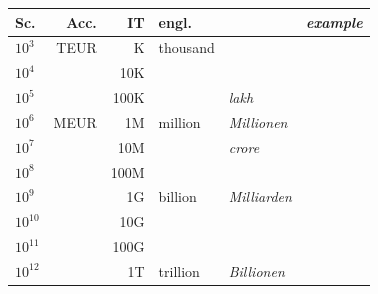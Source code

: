 \documentclass{standalone}
\begin{document}
       \begin{tabular}{lrrll|l}
        Sc. & Acc. & IT & engl. &  & \textit{example} \\
        \toprule
         $10^3$ & TEUR & K & thousand &  & \phantom{laptop/computer}\\
        $10^4$ & & 10K & &  & \\
        $10^5$ & & 100K & & \emph{lakh} & \\
        \midrule
        $10^6$ & MEUR& 1M & million & \emph{Millionen} &  \\
        $10^7$ & & 10M & &  \emph{crore} & \\
        $10^8$ & & 100M & &  & \\
        \midrule
        $10^9$ &  & 1G & billion & \emph{Milliarden}  & \\
        $10^{10}$ & & 10G & &  & \\
        $10^{11}$ &  & 100G & &  & \\
        \midrule
        $10^{12}$ &  & 1T & trillion & \emph{Billionen} & \\
        \bottomrule
    \end{tabular}
\end{document}
